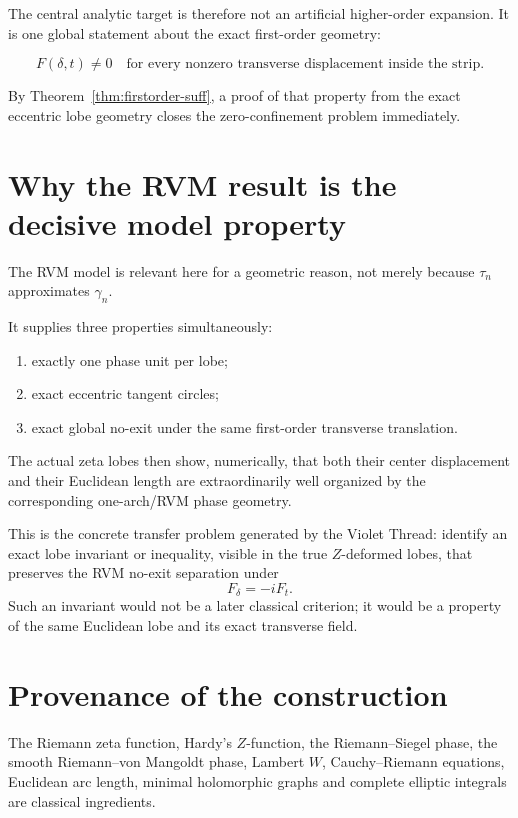 \documentclass[11pt]{article}
\theoremstyle{definition}
\begin{document}
The central analytic target is therefore not an artificial higher-order
expansion.  It is one global statement about the exact first-order geometry:

\[
\boxed{
F(\delta,t)\neq0
\quad
\text{for every nonzero transverse displacement inside the strip}.
}
\]

By Theorem~\ref{thm:firstorder-suff}, a proof of that property from the exact
eccentric lobe geometry closes the zero-confinement problem immediately.

\section{Why the RVM result is the decisive model property}

The RVM model is relevant here for a geometric reason, not merely because
$\tau_n$ approximates $\gamma_n$.

It supplies three properties simultaneously:
\begin{enumerate}[leftmargin=1.8em]
\item exactly one phase unit per lobe;
\item exact eccentric tangent circles;
\item exact global no-exit under the same first-order transverse translation.
\end{enumerate}

The actual zeta lobes then show, numerically, that both their center
displacement and their Euclidean length are extraordinarily well organized
by the corresponding one-arch/RVM phase geometry.

This is the concrete transfer problem generated by the Violet Thread:
identify an exact lobe invariant or inequality, visible in the true
$Z$-deformed lobes, that preserves the RVM no-exit separation under
\[
F_\delta=-iF_t.
\]
Such an invariant would not be a later classical criterion; it would be a
property of the same Euclidean lobe and its exact transverse field.

\section{Provenance of the construction}

The Riemann zeta function, Hardy's $Z$-function, the Riemann--Siegel phase,
the smooth Riemann--von Mangoldt phase, Lambert $W$, Cauchy--Riemann
equations, Euclidean arc length, minimal holomorphic graphs and complete
elliptic integrals are classical ingredients.
\end{document}
